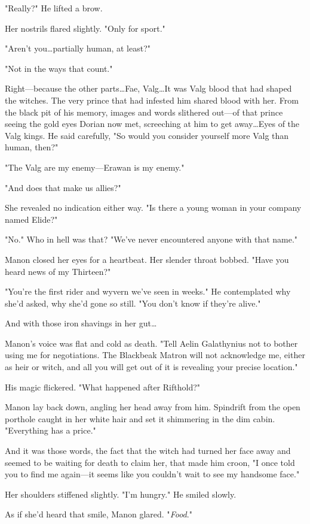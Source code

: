 "Really?"
He lifted a brow.

Her nostrils flared slightly.
"Only for sport."

"Aren't you\ldots partially human, at least?"

"Not in the ways that count."

Right---because the other parts\ldots Fae, Valg\ldots It was Valg blood that had shaped the witches.
The very prince that had infested him shared blood with her.
From the black pit of his memory, images and words slithered out---of that prince seeing the gold eyes Dorian now met, screeching at him to get away\ldots Eyes of the Valg kings.
He said carefully, "So would you consider yourself more Valg than human, then?"

"The Valg are my enemy---Erawan is my enemy."

"And does that make us allies?"

She revealed no indication either way.
"Is there a young woman in your company named Elide?"

"No."
Who in hell was that?
"We've never encountered anyone with that name."

Manon closed her eyes for a heartbeat.
Her slender throat bobbed.
"Have you heard news of my Thirteen?"

"You're the first rider and wyvern we've seen in weeks."
He contemplated why she'd asked, why she'd gone so still.
"You don't know if they're alive."

And with those iron shavings in her gut\ldots{}

Manon's voice was flat and cold as death.
"Tell Aelin Galathynius not to bother using me for negotiations.
The Blackbeak Matron will not acknowledge me, either as heir or witch, and all you will get out of it is revealing your precise location."

His magic flickered.
"What happened after Rifthold?"

Manon lay back down, angling her head away from him.
Spindrift from the open porthole caught in her white hair and set it shimmering in the dim cabin.
"Everything has a price."

And it was those words, the fact that the witch had turned her face away and seemed to be waiting for death to claim her, that made him croon, "I once told you to find me again---it seems like you couldn't wait to see my handsome face."

Her shoulders stiffened slightly.
"I'm hungry."
He smiled slowly.

As if she'd heard that smile, Manon glared.
"\emph{Food}."

